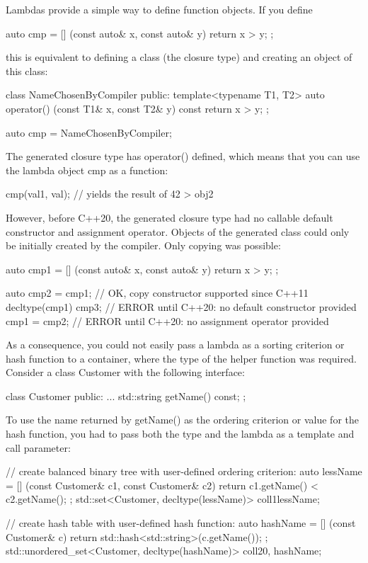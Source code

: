 Lambdas provide a simple way to define function objects. If you define

\begin{cpp}
auto cmp = [] (const auto& x, const auto& y) {
				return x > y;
			};
\end{cpp}

this is equivalent to defining a class (the closure type) and creating an object of this class:

\begin{cpp}
class NameChosenByCompiler {
	public:
	template<typename T1, T2>
	auto operator() (const T1& x, const T2& y) const {
		return x > y;
	}
};

auto cmp = NameChosenByCompiler{};
\end{cpp}

The generated closure type has operator() defined, which means that you can use the lambda object cmp as a function:

\begin{cpp}
cmp(val1, val); // yields the result of 42 > obj2
\end{cpp}

However, before C++20, the generated closure type had no callable default constructor and assignment operator. Objects of the generated class could only be initially created by the compiler. Only copying was possible:

\begin{cpp}
auto cmp1 = [] (const auto& x, const auto& y) {
				return x > y;
			};
			
auto cmp2 = cmp1; // OK, copy constructor supported since C++11
decltype(cmp1) cmp3; // ERROR until C++20: no default constructor provided
cmp1 = cmp2; // ERROR until C++20: no assignment operator provided
\end{cpp}

As a consequence, you could not easily pass a lambda as a sorting criterion or hash function to a container, where the type of the helper function was required. Consider a class Customer with the following interface:

\begin{cpp}
class Customer
{
	public:
	...
	std::string getName() const;
};
\end{cpp}

To use the name returned by getName() as the ordering criterion or value for the hash function, you had to pass both the type and the lambda as a template and call parameter:

\begin{cpp}
// create balanced binary tree with user-defined ordering criterion:
auto lessName = [] (const Customer& c1, const Customer& c2) {
	return c1.getName() < c2.getName();
};
std::set<Customer, decltype(lessName)> coll1{lessName};

// create hash table with user-defined hash function:
auto hashName = [] (const Customer& c) {
	return std::hash<std::string>{}(c.getName());
};
std::unordered_set<Customer, decltype(hashName)> coll2{0, hashName};
\end{cpp}

